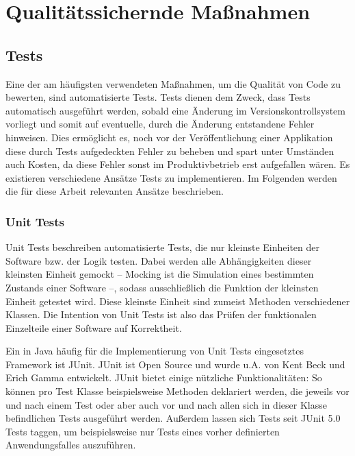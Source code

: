 	\section{Qualitätssichernde Maßnahmen} %
	
		\subsection{Tests} %
		\label{qm.tests}
		
			Eine der am häufigsten verwendeten Maßnahmen, um die Qualität von Code zu bewerten, sind automatisierte Tests. Tests dienen dem Zweck, dass Tests automatisch ausgeführt werden, sobald eine Änderung im Versionskontrollsystem vorliegt und somit auf eventuelle, durch die Änderung entstandene Fehler hinweisen. Dies ermöglicht es, noch vor der Veröffentlichung einer Applikation diese durch Tests aufgedeckten Fehler zu beheben und spart unter Umständen auch Kosten, da diese Fehler sonst im Produktivbetrieb erst aufgefallen wären. \cite{Huizinga.2007} Es existieren verschiedene Ansätze Tests zu implementieren. Im Folgenden werden die für diese Arbeit relevanten Ansätze beschrieben. 
			
			\subsubsection{Unit Tests}
			
				Unit Tests beschreiben automatisierte Tests, die nur kleinste Einheiten der Software bzw. der Logik testen. Dabei werden alle Abhängigkeiten dieser kleinsten Einheit gemockt -- Mocking ist die Simulation eines bestimmten Zustands einer Software --, sodass ausschließlich die Funktion der kleinsten Einheit getestet wird. Diese kleinste Einheit sind zumeist Methoden verschiedener Klassen. Die Intention von Unit Tests ist also das Prüfen der funktionalen Einzelteile einer Software auf Korrektheit. 
			
				Ein in Java häufig für die Implementierung von Unit Tests eingesetztes Framework ist JUnit. JUnit ist Open Source und wurde u.A. von Kent Beck und Erich Gamma entwickelt. JUnit bietet einige nützliche Funktionalitäten: So können pro Test Klasse beispielsweise Methoden deklariert werden, die jeweils vor und nach einem Test oder aber auch vor und nach allen sich in dieser Klasse befindlichen Tests ausgeführt werden. Außerdem lassen sich Tests seit JUnit 5.0 Tests taggen, um beispielsweise nur Tests eines vorher definierten Anwendungsfalles auszuführen. \cite{Team.312020}
				
